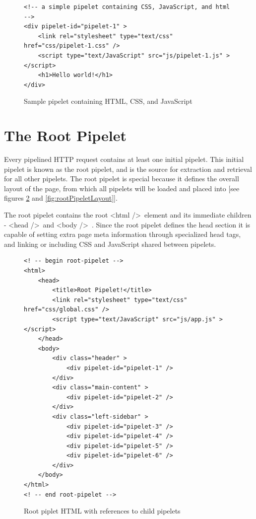 \documentclass[12pt]{report}
\begin{document}
\begin{figure}[H]
\begin{lstlisting}
<!-- a simple pipelet containing CSS, JavaScript, and html -->
<div pipelet-id="pipelet-1" >
	<link rel="stylesheet" type="text/css" href="css/pipelet-1.css" />
	<script type="text/JavaScript" src="js/pipelet-1.js" ></script>
	<h1>Hello world!</h1>
</div>
\end{lstlisting}
\caption{Sample pipelet containing HTML, CSS, and JavaScript}
\label{fig:samplePipelet}
\end{figure}


\section{The Root Pipelet}
Every pipelined HTTP request contains at least one initial pipelet. This initial pipelet is known as the root pipelet, and is the source for extraction and retrieval for all other pipelets. The root pipelet is special because it defines the overall layout of the page, from which all pipelets will be loaded and placed into [see figures \ref{fig:sampleRootPipelet} and \ref{fig:rootPipeletLayout}]. 
	
The root pipelet contains the root \textless html /\textgreater\ element and its immediate children - \textless head /\textgreater\ and \textless body /\textgreater\ . Since the root pipelet defines the head section it is capable of setting extra page meta information through specialized head tags, and linking or including CSS and JavaScript shared between pipelets.

\begin{figure}[H]
\begin{lstlisting}
<! -- begin root-pipelet -->
<html>
	<head>
		<title>Root Pipelet!</title>
		<link rel="stylesheet" type="text/css" href="css/global.css" />
		<script type="text/JavaScript" src="js/app.js" ></script>
	</head>
	<body>
		<div class="header" >
			<div pipelet-id="pipelet-1" />
		</div>
		<div class="main-content" >
			<div pipelet-id="pipelet-2" />
		</div>
		<div class="left-sidebar" >
			<div pipelet-id="pipelet-3" />
			<div pipelet-id="pipelet-4" />
			<div pipelet-id="pipelet-5" />
			<div pipelet-id="pipelet-6" />
		</div>
	</body>
</html>
<! -- end root-pipelet -->
\end{lstlisting}
\caption{Root piplet HTML with references to child pipelets}
\label{fig:sampleRootPipelet}
\end{figure}
\end{document}
